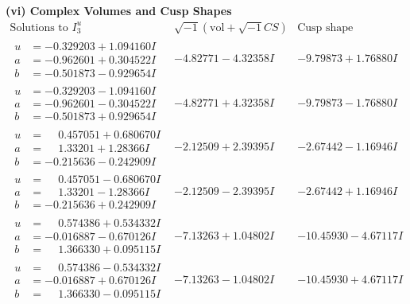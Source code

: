 \documentclass[1p]{elsarticle_modified}
\theoremstyle{definition}
\newcommand{\I}{\sqrt{-1}}
\begin{document}
\newpage\flushleft \textbf{(vi) Complex Volumes and Cusp Shapes}
$$\begin{array}{c|c|c}  
\text{Solutions to }I^u_{3}& \I (\text{vol} + \sqrt{-1}CS) & \text{Cusp shape}\\
 \hline 
\begin{aligned}
u &= -0.329203 + 1.094160 I \\
a &= -0.962601 + 0.304522 I \\
b &= -0.501873 - 0.929654 I\end{aligned}
 & -4.82771 - 4.32358 I & -9.79873 + 1.76880 I \\ \hline\begin{aligned}
u &= -0.329203 - 1.094160 I \\
a &= -0.962601 - 0.304522 I \\
b &= -0.501873 + 0.929654 I\end{aligned}
 & -4.82771 + 4.32358 I & -9.79873 - 1.76880 I \\ \hline\begin{aligned}
u &= \phantom{-}0.457051 + 0.680670 I \\
a &= \phantom{-}1.33201 + 1.28366 I \\
b &= -0.215636 - 0.242909 I\end{aligned}
 & -2.12509 + 2.39395 I & -2.67442 - 1.16946 I \\ \hline\begin{aligned}
u &= \phantom{-}0.457051 - 0.680670 I \\
a &= \phantom{-}1.33201 - 1.28366 I \\
b &= -0.215636 + 0.242909 I\end{aligned}
 & -2.12509 - 2.39395 I & -2.67442 + 1.16946 I \\ \hline\begin{aligned}
u &= \phantom{-}0.574386 + 0.534332 I \\
a &= -0.016887 - 0.670126 I \\
b &= \phantom{-}1.366330 + 0.095115 I\end{aligned}
 & -7.13263 + 1.04802 I & -10.45930 - 4.67117 I \\ \hline\begin{aligned}
u &= \phantom{-}0.574386 - 0.534332 I \\
a &= -0.016887 + 0.670126 I \\
b &= \phantom{-}1.366330 - 0.095115 I\end{aligned}
 & -7.13263 - 1.04802 I & -10.45930 + 4.67117 I \\ \hline\begin{aligned}

\end{aligned}
\end{array}$$
\end{document}
